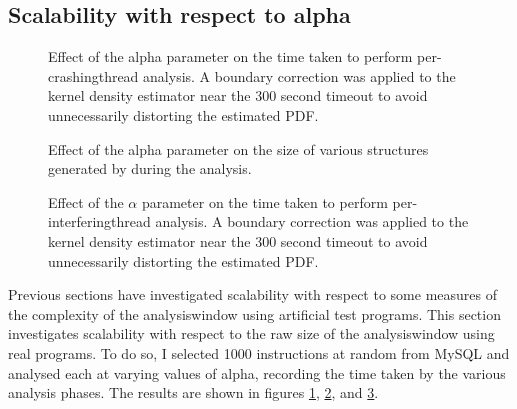 \subsection{Scalability with respect to \gls{alpha}}


\begin{figure}
  \caption{Effect of the \gls{alpha} parameter on the time taken to
    perform per-\gls{crashingthread} analysis.  A boundary correction
    was applied to the kernel density estimator near the 300 second
    timeout to avoid unnecessarily distorting the estimated PDF.}
  \label{fig:perf:alpha:bpm:unopt}
\end{figure}

\begin{figure}
  \caption{Effect of the \gls{alpha} parameter on the size of various
    structures generated by {\technique} during the analysis.}
  \label{fig:eval:time_breakdown:crashing_size}
\end{figure}

\begin{figure}
  \caption{Effect of the $\alpha$ parameter on the time taken to
    perform per-\gls{interferingthread} analysis. A boundary
    correction was applied to the kernel density estimator near the
    300 second timeout to avoid unnecessarily distorting the estimated
    PDF.}
  \label{fig:perf:alpha:gsc:unopt}
\end{figure}

Previous sections have investigated scalability with respect to some
measures of the complexity of the \gls{analysiswindow} using
artificial test programs.  This section investigates scalability with
respect to the raw size of the \gls{analysiswindow} using real
programs.  To do so, I selected 1000 instructions at random from MySQL
and analysed each at varying values of \gls{alpha}, recording the time
taken by the various analysis phases.  The results are shown in
figures \ref{fig:perf:alpha:bpm:unopt},
\ref{fig:eval:time_breakdown:crashing_size}, and
\ref{fig:perf:alpha:gsc:unopt}.    


